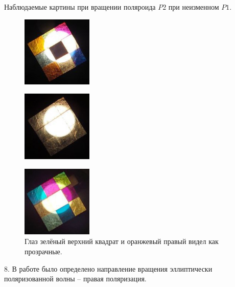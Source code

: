 Наблюдаемые картины при вращении поляроида $P2$ при неизменном $P1$.

\begin{figure}
	\centering
	\includegraphics[width=0.3\textwidth]{../Изображения/4.jpg}
\end{figure}

\begin{figure}
	\centering
	\includegraphics[width=0.3\textwidth]{../Изображения/5.jpg}
\end{figure}

\begin{figure}
	\centering
	\includegraphics[width=0.3\textwidth]{../Изображения/6.jpg}
	\caption{Глаз зелёный верхний квадрат и оранжевый правый видел как прозрачные.}
\end{figure}

8. В работе было определено направление вращения эллиптически поляризованной волны -- правая поляризация.